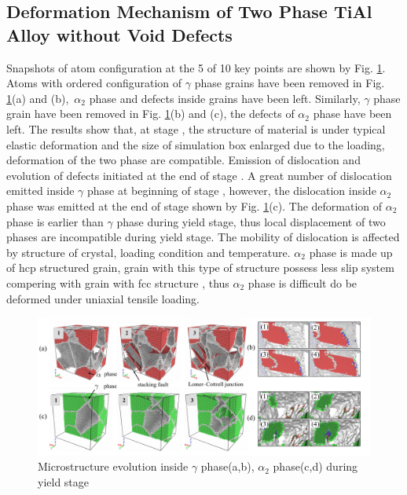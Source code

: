 \documentclass[Unknown,article,submit,moreauthors,pdftex,10pt,a4paper]{Definitions/mdpi}
\begin{document}
\subsection{Deformation Mechanism of Two Phase TiAl Alloy without Void Defects}
Snapshots of atom configuration at the 5 of 10 key points are shown by Fig. \ref{fig:Defect}.  Atoms with ordered configuration  of $\gamma$ phase grains have been removed in Fig. \ref{fig:Defect}(a) and (b),\ $\alpha_2$ phase and defects inside grains have been left. Similarly, $\gamma$ phase grain have been removed in Fig. \ref{fig:Defect}(b) and (c), the defects of $\alpha_2$ phase have been left.  The results show that, at stage \uppercase\expandafter{}, the structure of material is under typical elastic deformation and the size of simulation box enlarged due to the loading, deformation of the two phase are compatible. Emission of dislocation and evolution of defects initiated at the end of stage \uppercase\expandafter{}. A  great number of dislocation emitted inside $\gamma$ phase at beginning of stage \uppercase\expandafter{}, however, the dislocation inside $\alpha_2$ phase was emitted at the end of stage \uppercase\expandafter{} shown by Fig. \ref{fig:Defect}(c). The deformation of $\alpha_2$ phase is earlier than $\gamma$ phase during yield stage, thus local displacement of two phases are incompatible during yield stage. The mobility of dislocation is affected by structure of crystal, loading condition and temperature. $\alpha_2$ phase is made up of hcp  structured grain, grain with this type of structure possess less slip system compering with grain with fcc structure \cite{Zhu2012}, thus $\alpha_2$ phase is difficult do be deformed under uniaxial tensile loading. 
\begin{figure}[ht] 
	\centering
	\includegraphics[width=1\linewidth]{img/def-box}
	\caption{Microstructure evolution inside $\gamma$ phase(a,b), $\alpha_2$ phase(c,d) during yield stage}
	\label{fig:Defect}
\end{figure}
\end{document}
